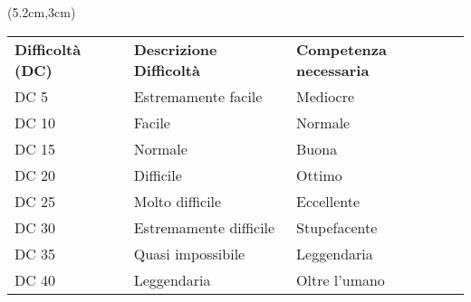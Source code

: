 \documentclass[a4paper,12 pt,openany]{book}
\begin{document}
	\begin{textblock*}{15cm}(5.2cm,3cm) %
		\footnotesize 	
		\begin{tabular}{lll}
			\textbf{Difficoltà (DC)} & \textbf{Descrizione Difficoltà} & \textbf{ Competenza necessaria} \\
			DC 5                      & Estremamente facile              & Mediocre                        \\
			DC 10                     & Facile                           & Normale                         \\
			DC 15                     & Normale                          & Buona                           \\
			DC 20                     & Difficile                        & Ottimo                          \\
			DC 25                     & Molto difficile                  & Eccellente                      \\
			DC 30                     & Estremamente difficile           & Stupefacente                    \\
			DC 35                     & Quasi impossibile                & Leggendaria                     \\
			DC 40                     & Leggendaria                      & Oltre l'umano                   \\
		\end{tabular}
	\end{textblock*}
	
\end{document}

